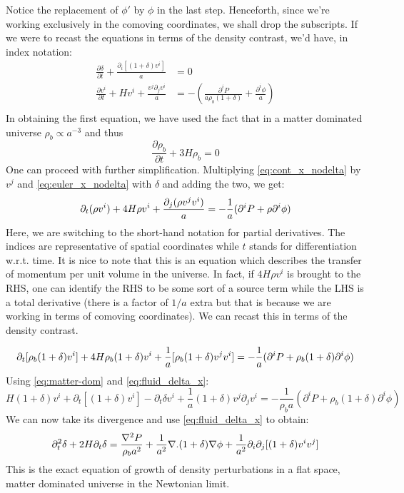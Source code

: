 \documentclass[12pt,a4paper,twoside]{book}
\def\pa{{\partial}}
\begin{document}
			Notice the replacement of $\phi'$ by $\phi$ in the last step. Henceforth, since we're working exclusively in the comoving coordinates, we shall drop the subscripts. If we were to recast the equations in terms of the density contrast, we'd have, in index notation:
			\begin{equation}
				\begin{aligned}
					\frac{\partial \delta}{\partial t}+\frac{\partial_i\left[(1+\delta)v^i\right]}{a}&=0\\
					\frac{\partial v^i}{\partial t}+Hv^i+\frac{v^j\partial_jv^i}{a}&=-\left(\frac{\partial^i P}{a\rho_b(1+\delta)}+\frac{\partial^i\phi}{a}\right)\\
				\end{aligned}
				\label{eq:fluid_delta_x}
			\end{equation}
			In obtaining the first equation, we have used the fact that in a matter dominated universe $\rho_b\propto a^{-3}$ and thus
			\begin{equation}
				\frac{\partial \rho_b}{\partial t}+3H\rho_b=0
				\label{eq:matter-dom}
			\end{equation}
			One can proceed with further simplification. Multiplying \ref{eq:cont_x_nodelta} by $v^j$ and \ref{eq:euler_x_nodelta} with $\delta$ and adding the two, we get:
			\begin{equation}
				\partial_t(\rho v^i)+4H\rho v^i+\frac{\partial_j(\rho v^jv^i)}{a}=-\frac{1}{a}(\partial^iP+\rho\partial^i\phi)\\
				\label{eq:rho-vi_combo}
			\end{equation}
			Here, we are switching to the short-hand notation for partial derivatives. The indices are representative of spatial coordinates while $t$ stands for differentiation w.r.t. time. It is nice to note that this is an equation which describes the transfer of momentum per unit volume in the universe. In fact, if $4H\rho v^i$ is brought to the RHS, one can identify the RHS to be some sort of a source term while the LHS is a total derivative (there is a factor of $1/a$ extra but that is because we are working in terms of comoving coordinates). We can recast this in terms of the density contrast.
			
				$$
					\pa_t[\rho_b(1+\delta)v^i]+4H\rho_b(1+\delta)v^i+\frac{1}{a}[\rho_b(1+\delta)v^jv^i]=-\frac{1}{a}(\pa^iP+\rho_b(1+\delta)\pa^i\phi)\\
				$$
			Using \ref{eq:matter-dom} and \ref{eq:fluid_delta_x}:
			$$
			H(1+\delta)v^i+\pa_t[(1+\delta)v^i]-\pa_t\delta v^i+\frac{1}{a}(1+\delta)v^j\pa_jv^i=-\frac{1}{\rho_ba}(\pa^iP+\rho_b(1+\delta)\pa^i\phi)
			$$
			We can now take its divergence and use \ref{eq:fluid_delta_x} to obtain:
			\begin{equation}
				\pa_t^2\delta+2H\pa_t\delta=\frac{\nabla^2P}{\rho_ba^2}+\frac{1}{a^2}\nabla.(1+\delta)\nabla\phi+\frac{1}{a^2}\pa_i\pa_j[(1+\delta)v^iv^j]\\
				\label{eq:newt-perturb-exact}
			\end{equation}
			This is the exact equation of growth of density perturbations in a flat space, matter dominated universe in the Newtonian limit.			
\end{document}

